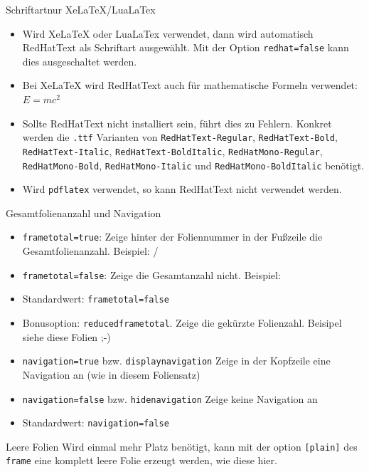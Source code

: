 \documentclass[german,10pt,compress]{beamer}
\begin{document}
\begin{frame}{Schriftart}{nur XeLaTeX/LuaLaTex}
	\begin{itemize}
		\item Wird XeLaTeX oder LuaLaTex verwendet, dann wird automatisch RedHatText als Schriftart ausgewählt. Mit der Option \lstinline!redhat=false! kann dies ausgeschaltet werden.
		\item Bei XeLaTeX wird RedHatText auch für mathematische Formeln verwendet: $E=mc^2$
		\item Sollte RedHatText nicht installiert sein, führt dies zu Fehlern. Konkret werden die \lstinline!.ttf! Varianten von \lstinline!RedHatText-Regular!, \lstinline!RedHatText-Bold!, \lstinline!RedHatText-Italic!, \lstinline!RedHatText-BoldItalic!, \lstinline!RedHatMono-Regular!, \lstinline!RedHatMono-Bold!, \lstinline!RedHatMono-Italic! und \lstinline!RedHatMono-BoldItalic! benötigt.
		\item Wird \lstinline!pdflatex! verwendet, so kann RedHatText nicht verwendet werden.
	\end{itemize}
\end{frame}
\begin{frame}{Gesamtfolienanzahl und Navigation}
	\begin{itemize}
		\item \lstinline|frametotal=true|: Zeige hinter der Foliennummer in der Fußzeile die Gesamtfolienanzahl. Beispiel: \insertframenumber{}/\inserttotalframenumber
		\item \lstinline|frametotal=false|: Zeige die Gesamtanzahl nicht. Beispiel: \insertframenumber{}
		\item Standardwert: \lstinline|frametotal=false|
		\item Bonusoption: \lstinline|reducedframetotal|. Zeige die gekürzte Folienzahl. Beisipel siehe diese Folien ;-)
	\end{itemize}
	\vspace{\baselineskip}
	\begin{itemize}
		\item \lstinline|navigation=true| bzw. \lstinline|displaynavigation| Zeige in der Kopfzeile eine Navigation an (wie in diesem Foliensatz)
		\item \lstinline|navigation=false| bzw. \lstinline|hidenavigation| Zeige keine Navigation an
		\item Standardwert: \lstinline|navigation=false|
	\end{itemize}
\end{frame}
\begin{frame}[plain]{Leere Folien}
	Wird einmal mehr Platz benötigt, kann mit der option \lstinline|[plain]| des \lstinline|frame| eine komplett leere Folie erzeugt werden, wie diese hier.
\end{frame}
\end{document}
